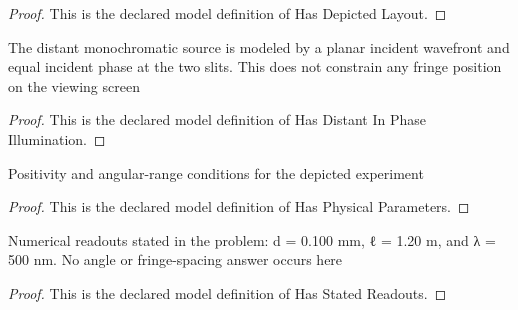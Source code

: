 \begin{proof}
  This is the declared model definition of Has Depicted Layout.
\end{proof}
\begin{definition}
  \label{def:physics:phyx-mini-0125:phyxminiproblems-problemphyxmini0125-hasdistantinphaseillumination}
  The distant monochromatic source is modeled by a planar incident wavefront and equal incident phase at the two slits. This does not constrain any fringe position on the viewing screen
\end{definition}
\begin{proof}
  This is the declared model definition of Has Distant In Phase Illumination.
\end{proof}
\begin{definition}
  \label{def:physics:phyx-mini-0125:phyxminiproblems-problemphyxmini0125-hasphysicalparameters}
  Positivity and angular-range conditions for the depicted experiment
\end{definition}
\begin{proof}
  This is the declared model definition of Has Physical Parameters.
\end{proof}
\begin{definition}
  \label{def:physics:phyx-mini-0125:phyxminiproblems-problemphyxmini0125-hasstatedreadouts}
  Numerical readouts stated in the problem: d = 0.100 mm, ℓ = 1.20 m, and λ = 500 nm. No angle or fringe-spacing answer occurs here
\end{definition}
\begin{proof}
  This is the declared model definition of Has Stated Readouts.
\end{proof}
